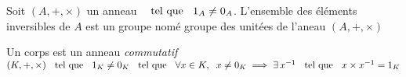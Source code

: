 \begin{prp}
Soit $(A, +, \times)$ un anneau $\;\;\text{ tel que }\;\; 1_A \neq 0_A$.
L'ensemble des éléments inversibles de $A$ est un groupe nomé groupe des
unitées de l'aneau $(A, +, \times)$
\end{prp}

\begin{dfn}[Corps]
Un corps est un anneau \emph{commutatif} $(K, +, \times) \;\;\text{ tel que }\;\; 1_K \neq 0_K
\\ \;\;\text{ tel que }\;\; \forall x \in K, \;\; x \neq 0_K \implies \exists \, x^{-1} \;\;\text{ tel que }\;\;
x \times x^{-1} = 1_K$
\end{dfn}


